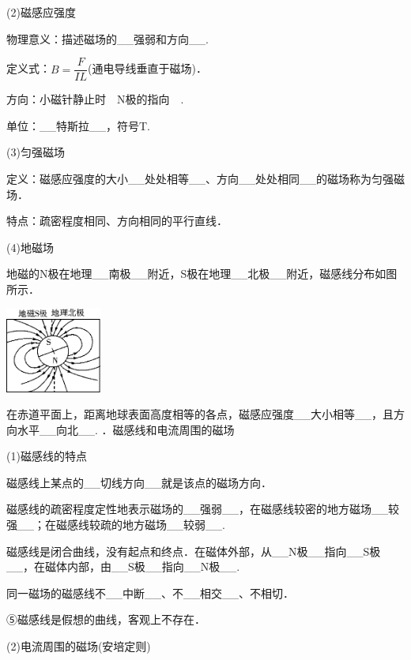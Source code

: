 \documentclass[cn,10.5pt,chinese,mac,chinesefont=founder]{elegantbook}
\begin{document}
(2)磁感应强度

物理意义：描述磁场的\_\_强弱和方向\_\_.

定义式：$B=\dfrac{F}{I L}$(通电导线垂直于磁场)．

方向：小磁针静止时　N极的指向　.

单位：\_\_特斯拉\_\_，符号T.

(3)匀强磁场

定义：磁感应强度的大小\_\_处处相等\_\_、方向\_\_处处相同\_\_的磁场称为匀强磁场．

特点：疏密程度相同、方向相同的平行直线．

(4)地磁场

地磁的N极在地理\_\_南极\_\_附近，S极在地理\_\_北极\_\_附近，磁感线分布如图所示．

\begin{center}\includegraphics[width=1.24514in,height=1.10347in]{media/image335.png}\end{center}

在赤道平面上，距离地球表面高度相等的各点，磁感应强度\_\_大小相等\_\_，且方向水平\_\_向北\_\_.
．磁感线和电流周围的磁场

(1)磁感线的特点

磁感线上某点的\_\_切线方向\_\_就是该点的磁场方向．

磁感线的疏密程度定性地表示磁场的\_\_强弱\_\_，在磁感线较密的地方磁场\_\_较强\_\_；在磁感线较疏的地方磁场\_\_较弱\_\_.

磁感线是闭合曲线，没有起点和终点．在磁体外部，从\_\_N极\_\_指向\_\_S极\_\_，在磁体内部，由\_\_S极\_\_指向\_\_N极\_\_.

同一磁场的磁感线不\_\_中断\_\_、不\_\_相交\_\_、不相切．

⑤磁感线是假想的曲线，客观上不存在．

(2)电流周围的磁场(安培定则)
\end{document}
